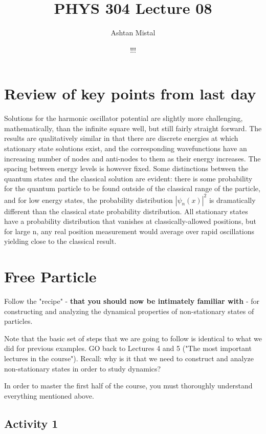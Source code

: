 \documentclass{article}
\title{PHYS 304 Lecture 08}
\author{Ashtan Mistal}
\date{!!!}
\begin{document}
\ifstandalone
\maketitle
\fi

\graphicspath{{./Lecture08/}}

\section{Review of key points from last day}

Solutions for the harmonic oscillator potential are slightly more challenging, mathematically, than the infinite square well, but still fairly straight forward. The results are qualitatively similar in that there are discrete energies at which stationary state solutions exist, and the corresponding wavefunctions have an increasing number of nodes and anti-nodes to them as their energy increases. The spacing between energy levels is however fixed. Some distinctions between the quantum states and the classical solution are evident: there is some probability for the quantum particle to be found outside of the classical range of the particle, and for low energy states, the probability distribution $|\psi_n(x)|^2$ is dramatically different than the classical state probability distribution.  All stationary states have a probability distribution that vanishes at classically-allowed positions, but for large n, any real position measurement would average over rapid oscillations yielding close to the classical result.

\section{Free Particle}

Follow the "recipe" - \textbf{that you should now be intimately familiar with} - for constructing and analyzing the dynamical properties of non-stationary states of particles. 

Note that the basic set of steps that we are going to follow is identical to what we did for previous examples. GO back to Lectures 4 and 5 ("The most important lectures in the course"). Recall: why is it that we need to construct and analyze non-stationary states in order to study dynamics?

In order to master the first half of the course, you must thoroughly understand everything mentioned above. 

\subsection{Activity 1}
\end{document}
